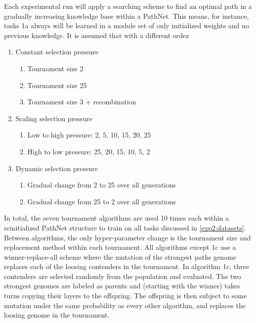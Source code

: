 Each experimental run will apply a searching scheme to find an optimal path in a gradually increasing knowledge base within a PathNet. This means, for instance, tasks 1a always will be learned in a module set of only initialized weights and no previous knowledge. It is assumed that with a different ordez
\begin{enumerate}
    \item Constant selection pressure
    \begin{enumerate}
        \item Tournament size 2
        \item Tournament size 25
        \item Tournament size 3 + recombination
    \end{enumerate}
    \item Scaling selection pressure
    \begin{enumerate}
        \item Low to high pressure: 2, 5, 10, 15, 20, 25
        \item High to low pressure: 25, 20, 15, 10, 5, 2
    \end{enumerate}
    \item Dynamic selection pressure
    \begin{enumerate}
        \item Gradual change from 2 to 25 over all generations
        \item Gradual change from 25 to 2 over all generations
    \end{enumerate}
\end{enumerate}
In total, the seven tournament algorithms are used 10 times each within a reinitialized PathNet structure to train on all tasks discussed in \ref{exp2:datasets}. Between algorithms, the only hyper-parameter change is the tournament size and replacement method within each tournament. All algorithms except 1c use a winner-replace-all scheme where the mutation of the strongest paths genome replaces each of the loosing contenders in the tournament. In algorithm 1c, three contenders are selected randomly from the population and evaluated. The two strongest genomes are labeled as parents and (starting with the winner) takes turns copying their layers to the offspring. The offspring is then subject to some mutation under the same probability as every other algorithm, and replaces the loosing genome in the tournament.
